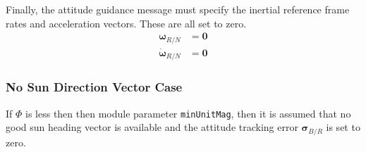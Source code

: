 Finally, the attitude guidance message must specify the inertial reference frame rates and acceleration vectors.  These are all set to zero.
\begin{align}
	\bm\omega_{R/N} &= \bm 0 \\
	\dot{\bm \omega}_{R/N} &= \bm 0
\end{align}

\subsubsection{No Sun Direction Vector Case}
 If $\Phi$ is less then then module parameter {\tt minUnitMag}, then it is assumed that no good sun heading vector is available and the attitude tracking error $\bm\sigma_{B/R}$ is set to zero.  

 